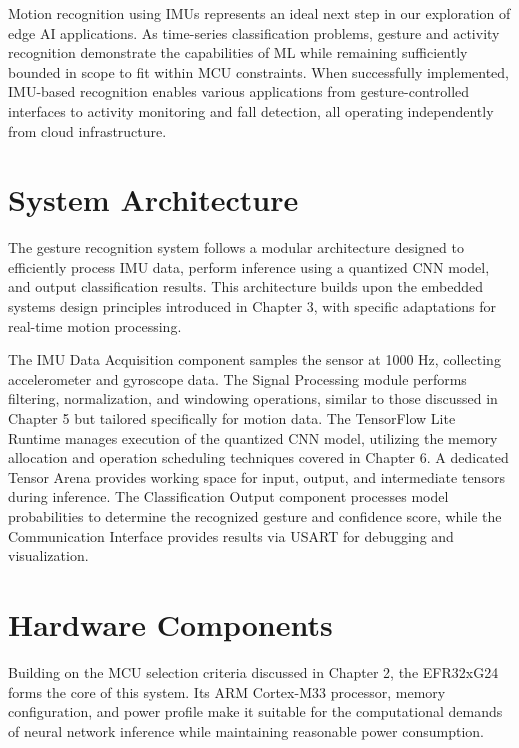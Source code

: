 \documentclass[
  9pt,
  letterpaper,
  abstract,
  titlepage]{scrbook}
\begin{document}
Motion recognition using IMUs represents an ideal next step in our
exploration of edge AI applications. As time-series classification
problems, gesture and activity recognition demonstrate the capabilities
of ML while remaining sufficiently bounded in scope to fit within MCU
constraints. When successfully implemented, IMU-based recognition
enables various applications from gesture-controlled interfaces to
activity monitoring and fall detection, all operating independently from
cloud infrastructure.

\section{System Architecture}\label{system-architecture-1}

The gesture recognition system follows a modular architecture designed
to efficiently process IMU data, perform inference using a quantized CNN
model, and output classification results. This architecture builds upon
the embedded systems design principles introduced in Chapter 3, with
specific adaptations for real-time motion processing.

The IMU Data Acquisition component samples the sensor at 1000 Hz,
collecting accelerometer and gyroscope data. The Signal Processing
module performs filtering, normalization, and windowing operations,
similar to those discussed in Chapter 5 but tailored specifically for
motion data. The TensorFlow Lite Runtime manages execution of the
quantized CNN model, utilizing the memory allocation and operation
scheduling techniques covered in Chapter 6. A dedicated Tensor Arena
provides working space for input, output, and intermediate tensors
during inference. The Classification Output component processes model
probabilities to determine the recognized gesture and confidence score,
while the Communication Interface provides results via USART for
debugging and visualization.

\section{Hardware Components}\label{hardware-components}

Building on the MCU selection criteria discussed in Chapter 2, the
EFR32xG24 forms the core of this system. Its ARM Cortex-M33 processor,
memory configuration, and power profile make it suitable for the
computational demands of neural network inference while maintaining
reasonable power consumption.
\end{document}
